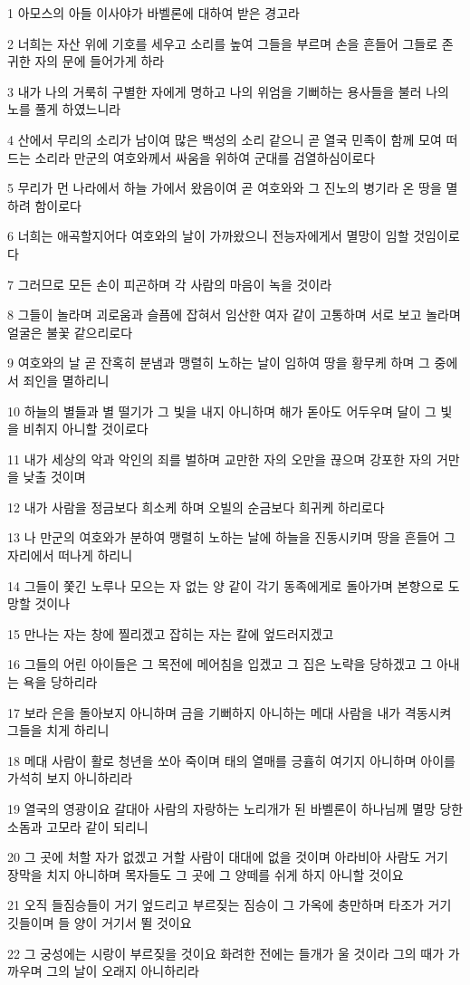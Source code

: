 \par 1 아모스의 아들 이사야가 바벨론에 대하여 받은 경고라
\par 2 너희는 자산 위에 기호를 세우고 소리를 높여 그들을 부르며 손을 흔들어 그들로 존귀한 자의 문에 들어가게 하라
\par 3 내가 나의 거룩히 구별한 자에게 명하고 나의 위엄을 기뻐하는 용사들을 불러 나의 노를 풀게 하였느니라
\par 4 산에서 무리의 소리가 남이여 많은 백성의 소리 같으니 곧 열국 민족이 함께 모여 떠드는 소리라 만군의 여호와께서 싸움을 위하여 군대를 검열하심이로다
\par 5 무리가 먼 나라에서 하늘 가에서 왔음이여 곧 여호와와 그 진노의 병기라 온 땅을 멸하려 함이로다
\par 6 너희는 애곡할지어다 여호와의 날이 가까왔으니 전능자에게서 멸망이 임할 것임이로다
\par 7 그러므로 모든 손이 피곤하며 각 사람의 마음이 녹을 것이라
\par 8 그들이 놀라며 괴로움과 슬픔에 잡혀서 임산한 여자 같이 고통하며 서로 보고 놀라며 얼굴은 불꽃 같으리로다
\par 9 여호와의 날 곧 잔혹히 분냄과 맹렬히 노하는 날이 임하여 땅을 황무케 하며 그 중에서 죄인을 멸하리니
\par 10 하늘의 별들과 별 떨기가 그 빛을 내지 아니하며 해가 돋아도 어두우며 달이 그 빛을 비취지 아니할 것이로다
\par 11 내가 세상의 악과 악인의 죄를 벌하며 교만한 자의 오만을 끊으며 강포한 자의 거만을 낮출 것이며
\par 12 내가 사람을 정금보다 희소케 하며 오빌의 순금보다 희귀케 하리로다
\par 13 나 만군의 여호와가 분하여 맹렬히 노하는 날에 하늘을 진동시키며 땅을 흔들어 그 자리에서 떠나게 하리니
\par 14 그들이 쫓긴 노루나 모으는 자 없는 양 같이 각기 동족에게로 돌아가며 본향으로 도망할 것이나
\par 15 만나는 자는 창에 찔리겠고 잡히는 자는 칼에 엎드러지겠고
\par 16 그들의 어린 아이들은 그 목전에 메어침을 입겠고 그 집은 노략을 당하겠고 그 아내는 욕을 당하리라
\par 17 보라 은을 돌아보지 아니하며 금을 기뻐하지 아니하는 메대 사람을 내가 격동시켜 그들을 치게 하리니
\par 18 메대 사람이 활로 청년을 쏘아 죽이며 태의 열매를 긍휼히 여기지 아니하며 아이를 가석히 보지 아니하리라
\par 19 열국의 영광이요 갈대아 사람의 자랑하는 노리개가 된 바벨론이 하나님께 멸망 당한 소돔과 고모라 같이 되리니
\par 20 그 곳에 처할 자가 없겠고 거할 사람이 대대에 없을 것이며 아라비아 사람도 거기 장막을 치지 아니하며 목자들도 그 곳에 그 양떼를 쉬게 하지 아니할 것이요
\par 21 오직 들짐승들이 거기 엎드리고 부르짖는 짐승이 그 가옥에 충만하며 타조가 거기 깃들이며 들 양이 거기서 뛸 것이요
\par 22 그 궁성에는 시랑이 부르짖을 것이요 화려한 전에는 들개가 울 것이라 그의 때가 가까우며 그의 날이 오래지 아니하리라

